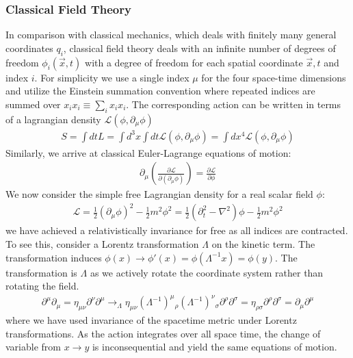 \subsubsection{Classical Field Theory}
In comparison with classical mechanics, which deals with finitely many  general
 coordinates $q_i$, classical field theory deals with an infinite number of degrees of freedom 
$\phi_i(\vec x, t)$ with a degree of freedom for each spatial coordinate  $\vec x,t$ and 
index $i$. For simplicity we use a single index $\mu$ for the four space-time dimensions and utilize
the Einstein summation convention where repeated indices are summed over $x_ix_i \equiv \sum_i x_i x_i$. 
The corresponding action can be written in terms of a lagrangian density $\mathcal{L}(\phi,\partial_\mu \phi)$ \cite{tong}
\begin{align*}
S = \int dt L = \int d^3x \int dt \mathcal{L}(\phi,\partial_\mu \phi) = \int dx^4 \mathcal{L}(\phi,\partial_\mu \phi)
\end{align*}
Similarly, we arrive at classical Euler-Lagrange equations of motion:
\begin{align*}
\partial_\mu \left( \frac{\partial\mathcal{L}}{\partial (\partial_\mu \phi)}\right) = \frac{\partial \mathcal{L}}{\partial\phi}
\end{align*}
We now consider the simple free Lagrangian density for a real scalar field $\phi$:
\begin{align*}
\mathcal{L} = \frac{1}{2}(\partial_\mu \phi)^2 - \frac{1}{2} m^2\phi^2 =  \frac{1}{2}(\partial_t^2 - \nabla^2) \phi - \frac{1}{2} m^2\phi^2 
\end{align*}
we have achieved a relativistically invariance for free as all indices are contracted. To see this, consider a Lorentz transformation $\Lambda$ on the kinetic term. The transformation induces $\phi(x) \rightarrow \phi'(x) = \phi(\Lambda^{-1} x) = \phi (y)$. The transformation is $\Lambda$ as we actively
rotate the coordinate system rather than rotating the field. 
\begin{align*} 
\partial^\mu \partial_\mu  = \eta_{\mu\nu} \partial^\nu \partial^\mu \rightarrow_\Lambda \eta_{\mu\nu} (\Lambda^{-1})^\mu{}_\rho 
(\Lambda^{-1})^\nu{}_\sigma \partial^\rho \partial^\sigma  =  \eta_{\rho\sigma} \partial^\rho \partial^\sigma = \partial_\mu \partial^\mu 
\end{align*}
where we have used invariance of the spacetime metric under Lorentz transformations.
As the action integrates over all space time, the change of variable from $x\rightarrow y$ is
inconsequential and yield the same equations of  motion.
